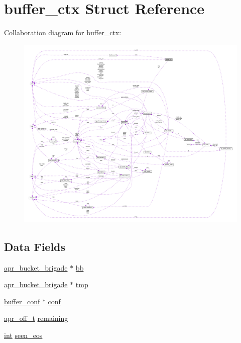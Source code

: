 \hypertarget{structbuffer__ctx}{}\section{buffer\+\_\+ctx Struct Reference}
\label{structbuffer__ctx}


Collaboration diagram for buffer\+\_\+ctx\+:
\nopagebreak
\begin{figure}[H]
\begin{center}
\leavevmode
\includegraphics[width=350pt]{structbuffer__ctx__coll__graph}
\end{center}
\end{figure}
\subsection*{Data Fields}
\begin{DoxyCompactItemize}
\item 
\hyperlink{structapr__bucket__brigade}{apr\+\_\+bucket\+\_\+brigade} $\ast$ \hyperlink{structbuffer__ctx_a9a86db743b69a1dc146ec4dc412a45be}{bb}
\item 
\hyperlink{structapr__bucket__brigade}{apr\+\_\+bucket\+\_\+brigade} $\ast$ \hyperlink{structbuffer__ctx_a0c9832c89789eac73d5a94d6d130b1d5}{tmp}
\item 
\hyperlink{structbuffer__conf}{buffer\+\_\+conf} $\ast$ \hyperlink{structbuffer__ctx_a7988fea5a734d716b21c595e6dafc526}{conf}
\item 
\hyperlink{group__apr__platform_ga6938af9075cec15c88299109381aa984}{apr\+\_\+off\+\_\+t} \hyperlink{structbuffer__ctx_a3fd015ec10378277d9e7748be749c75d}{remaining}
\item 
\hyperlink{pcre_8txt_a42dfa4ff673c82d8efe7144098fbc198}{int} \hyperlink{structbuffer__ctx_adcb2c2b04928a7d2470cc4aa8e7fad93}{seen\+\_\+eos}
\end{DoxyCompactItemize}


